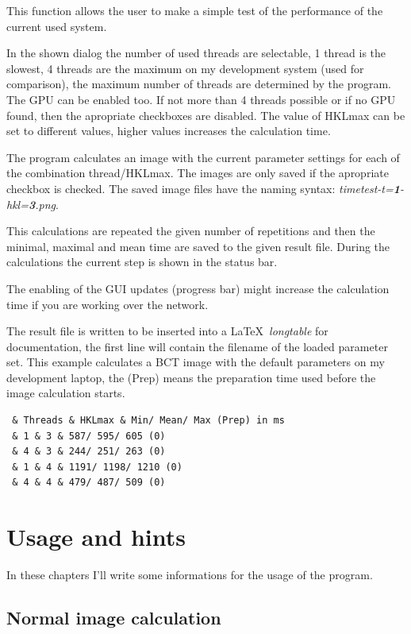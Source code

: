 \documentclass[11pt]{article} %
\begin{document}
This function allows the user to make a simple test of the performance of the current used system.

In the shown dialog the number of used threads are selectable, 1 thread is the slowest, 4 threads are the maximum on my development system (used for comparison), the maximum number of threads are determined by the program. The GPU can be enabled too. If not more than 4 threads possible or if no GPU found, then the apropriate checkboxes are disabled. The value of HKLmax can be set to different values, higher values increases the calculation time.

The program calculates an image with the current parameter settings for each of the combination thread/HKLmax. The images are only saved if the apropriate checkbox is checked. The saved image files have the naming syntax: {\it timetest-t={\bf 1}-hkl={\bf 3}.png}.

This calculations are repeated the given number of repetitions and then the minimal, maximal and mean time are saved to the given result file. During the calculations the current step is shown in the status bar.

The enabling of the GUI updates (progress bar) might increase the calculation time if you are working over the network.

The result file is written to be inserted into a \LaTeX\  {\it longtable} for documentation, the first line will contain the filename of the loaded parameter set. This example calculates a BCT image with the default parameters on my development laptop, the (Prep) means the preparation time used before the image calculation starts.
\begin{lstlisting}[frame=single, xleftmargin=1cm, xrightmargin=1cm]
% Loaded parameter: ?
 & Threads & HKLmax & Min/ Mean/ Max (Prep) in ms
 & 1 & 3 & 587/ 595/ 605 (0)
 & 4 & 3 & 244/ 251/ 263 (0)
 & 1 & 4 & 1191/ 1198/ 1210 (0)
 & 4 & 4 & 479/ 487/ 509 (0)
\end{lstlisting}




\section{Usage and hints}

In these chapters I'll write some informations for the usage of the program.

\subsection{Normal image calculation}
\end{document}
